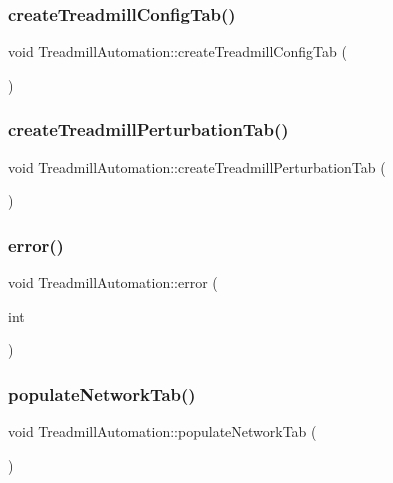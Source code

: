 \subsubsection{\texorpdfstring{create\+Treadmill\+Config\+Tab()}{createTreadmillConfigTab()}}
{\footnotesize\ttfamily void Treadmill\+Automation\+::create\+Treadmill\+Config\+Tab (\begin{DoxyParamCaption}{ }\end{DoxyParamCaption})}

\mbox{\label{class_treadmill_automation_afe4182a6c74b1cb88496f255727094db}} 
\subsubsection{\texorpdfstring{create\+Treadmill\+Perturbation\+Tab()}{createTreadmillPerturbationTab()}}
{\footnotesize\ttfamily void Treadmill\+Automation\+::create\+Treadmill\+Perturbation\+Tab (\begin{DoxyParamCaption}{ }\end{DoxyParamCaption})}

\mbox{\label{class_treadmill_automation_ac07500c11bc0801b84cfc7b0af137c5e}} 
\subsubsection{\texorpdfstring{error()}{error()}}
{\footnotesize\ttfamily void Treadmill\+Automation\+::error (\begin{DoxyParamCaption}\item[{int}]{ }\end{DoxyParamCaption})}

\mbox{\label{class_treadmill_automation_a05a1f1d52849b9c6ac7c277bd069bda0}} 
\subsubsection{\texorpdfstring{populate\+Network\+Tab()}{populateNetworkTab()}}
{\footnotesize\ttfamily void Treadmill\+Automation\+::populate\+Network\+Tab (\begin{DoxyParamCaption}{ }\end{DoxyParamCaption})}

